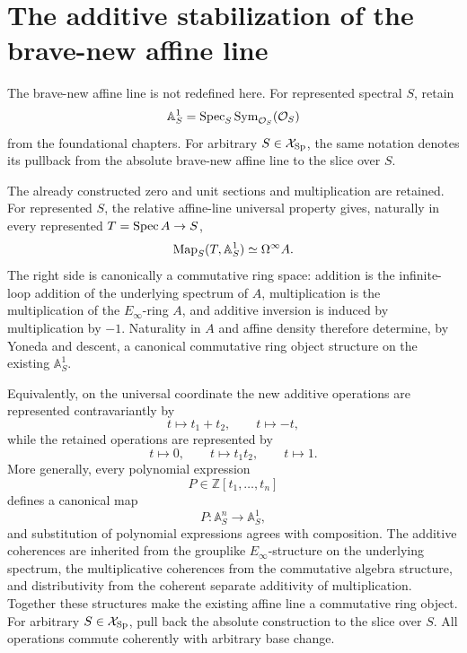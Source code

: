 \section{The additive stabilization of the brave-new affine line}
\label{sec:additive-scalar-spectrum}

The brave-new affine line is not redefined here.  For represented spectral \(S\), retain
\[
    \mathbb A^1_S
    =
    \operatorname{Spec}_S\operatorname{Sym}_{\mathcal O_S}(\mathcal O_S)
\]
from the foundational chapters.  For arbitrary \(S\in\mathcal X_{\mathrm{Sp}}\), the same notation denotes
its pullback from the absolute brave-new affine line to the slice over \(S\).

\begin{construction}
\label{constr:additive-ring-affine-line}
The already constructed zero and unit sections and multiplication are retained.  For represented
\(S\), the relative affine-line universal property gives, naturally in every represented
\(T=\operatorname{Spec} A\to S\),
\[
    \operatorname{Map}_S(T,\mathbb A^1_S)
    \simeq
    \Omega^\infty A.
\]
The right side is canonically a commutative ring space: addition is the infinite-loop addition of the
underlying spectrum of \(A\), multiplication is the multiplication of the \(E_\infty\)-ring \(A\),
and additive inversion is induced by multiplication by \(-1\).  Naturality in \(A\) and affine
density therefore determine, by Yoneda and descent, a canonical commutative ring object structure on
the existing \(\mathbb A^1_S\).

Equivalently, on the universal coordinate the new additive operations are represented
contravariantly by
\[
    t\longmapsto t_1+t_2,
    \qquad
    t\longmapsto -t,
\]
while the retained operations are represented by
\[
    t\longmapsto 0,
    \qquad
    t\longmapsto t_1t_2,
    \qquad
    t\longmapsto1.
\]
More generally, every polynomial expression
\[
    P\in\mathbb Z[t_1,\ldots,t_n]
\]
defines a canonical map
\[
    P:\mathbb A_S^n\longrightarrow\mathbb A_S^1,
\]
and substitution of polynomial expressions agrees with composition.  The additive coherences are inherited from the grouplike \(E_\infty\)-structure on the underlying
spectrum, the multiplicative coherences from the commutative algebra structure, and distributivity
from the coherent separate additivity of multiplication.  Together these structures make the existing
affine line a commutative ring object.  For arbitrary \(S\in\mathcal X_{\mathrm{Sp}}\), pull back the
absolute construction to the slice over \(S\).  All operations commute coherently with arbitrary
base change.
\end{construction}

